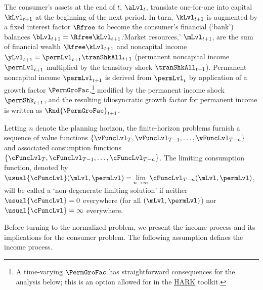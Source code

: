 \documentclass[BufferStockTheory]{subfiles}
\begin{document}

%
The consumer's assets at the end of $t$, $\aLvl_{t}$, translate one-for-one into capital $\kLvl_{t+1}$ at the beginning of the next period.
In turn, $\kLvl_{t+1}$ is augmented by a fixed interest factor $\Rfree$ to become the consumer's financial (`bank') balances $\bLvl_{t+1} = \Rfree \kLvl_{t+1}$.`Market resources,' $\mLvl_{t+1}$,  are the sum of financial wealth $\Rfree \kLvl_{t+1}$ and noncapital income $\yLvl_{t+1}=\permLvl_{t+1}\tranShkAll_{t+1}$ (permanent noncapital income $\permLvl_{t+1}$ multiplied by the transitory shock $\tranShkAll_{t+1}$).
Permanent noncapital income $\permLvl_{t+1}$ is derived from $\permLvl_{t}$ by application of a growth factor $\PermGroFac$,\footnote{A time-varying $\PermGroFac$ has straightforward consequences for the analysis below; this is an option allowed for in the \href{https://econ-ark.org}{HARK} toolkit.} modified by the permanent income shock $\permShk_{t+1}$, and the resulting idiosyncratic growth factor for permanent income is written as $\Rnd{\PermGroFac}_{t+1}$.

Letting $n$ denote the planning horizon, the finite-horizon problems furnish a sequence of value functions $\{\vFuncLvl_{T},\vFuncLvl_{T-1},\ldots,\vFuncLvl_{T-n}\}$ and associated consumption functions $\{\cFuncLvl_{T},\cFuncLvl_{T-1},\ldots,\cFuncLvl_{T-n}\}$.
The limiting consumption function, denoted by $\usual{\cFuncLvl}(\mLvl,\permLvl) = \lim\limits_{n \rightarrow \infty} \cFuncLvl_{T-n}(\mLvl,\permLvl)$, will be called a `non-degenerate limiting solution' if  neither $\usual{\cFuncLvl}=0$ everywhere (for all $(\mLvl,\permLvl)$) nor $\usual{\cFuncLvl}=\infty$ everywhere.

Before turning to the normalized problem, we present the income process and its implications for the consumer problem. The following assumption defines the income process.
\end{document}
